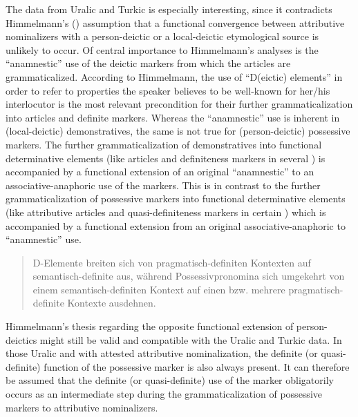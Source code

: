 {
The data from Uralic and Turkic is especially interesting, since it contradicts Himmelmann's (\citeyear[220–221]{himmelmann1997}) assumption that a functional convergence between attributive nominalizers with a person-deictic or a local-deictic etymological source is unlikely to occur. Of central importance to Himmelmann's analyses is the “anamnestic” use of the deictic markers from which the articles are grammaticalized. According to Himmelmann, the use of “D(eictic) elements” in order to refer to properties the speaker believes to be well-known for her/his interlocutor is the most relevant precondition for their further grammaticalization into articles and definite markers. Whereas the “anamnestic” use is inherent in (local-deictic) demonstratives, the same is not true for (person-deictic) possessive markers. The further grammaticalization of demonstratives into functional determinative elements (like articles and definiteness markers in several ) is accompanied by a functional extension of an original “anamnestic” to an associative-anaphoric use of the markers. This is in contrast to the further grammaticalization of possessive markers into functional determinative elements (like attributive articles and quasi-definiteness markers in certain ) which is accompanied by a functional extension from an original associative-anaphoric to “anamnestic” use.
\begin{quote}
D-Elemente breiten sich von pragmatisch-definiten Kontexten auf semantisch\hyp{}definite aus, während Possessivpronomina sich umgekehrt von einem semantisch\hyp{}definiten Kontext auf einen bzw. mehrere pragmatisch\hyp{}definite Kontexte ausdehnen. \citep[221]{himmelmann1997}
\end{quote}
Himmelmann's thesis regarding the opposite functional extension of person-deictics might still be valid and compatible with the Uralic and Turkic data. In those Uralic and  with attested attributive nominalization, the definite (or quasi-definite) function of the possessive marker is also always present. It can therefore be assumed that the definite (or quasi-definite) use of the marker obligatorily occurs as an intermediate step during the grammaticalization of possessive markers to attributive nominalizers.
}
